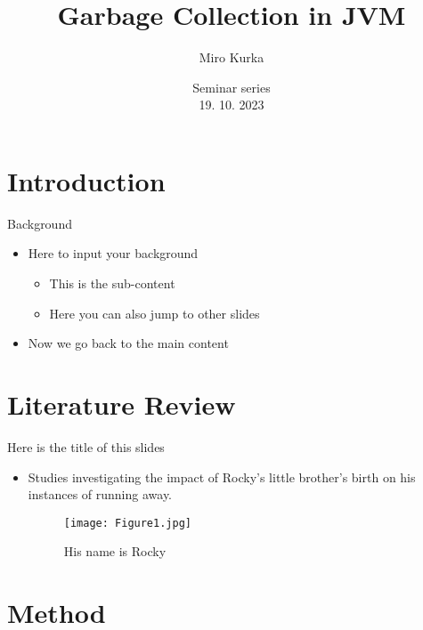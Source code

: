\documentclass[10pt, xcolor=x11names,compress]{beamer}
\author{Miro Kurka}
\title{Garbage Collection in JVM}
\institute{Pavol Jozef Safarik University}\date{Seminar series \\ 19. 10. 2023}
\begin{document}
 \begin{frame}
 \titlepage
 \end{frame}

\section{Introduction}
\begin{frame}[label=Background]{Background}
\begin{itemize}
\item Here to input your background\\
   \begin{itemize}
    \item This is the sub-content
    \item Here you can also jump to other slides \hyperlink{Rocky}{}
   \end{itemize}
\item Now we go back to the main content\\

\end{itemize}
\end{frame}

\section{Literature Review}
\begin{frame}{Here is the title of this slides}
\begin{itemize}
    \item Studies investigating the impact of Rocky's little brother's birth on his instances of running away. 
    \begin{figure}
        \centering
        \texttt{[image: Figure1.jpg]}
        \caption{His name is Rocky}
        \label{fig:enter-label}
    \end{figure}
\end{itemize}
\end{frame}

\section{Method}
 
\end{document}
